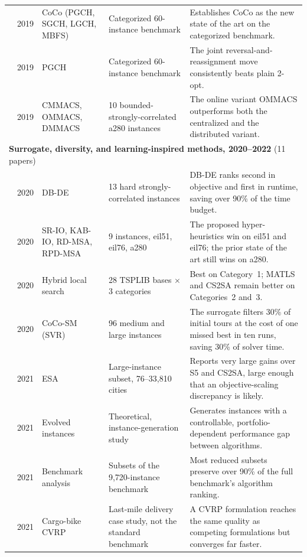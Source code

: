 {\begin{longtable}{@{}p{2.8cm}cp{3.0cm}p{4.9cm}p{7.9cm}@{}}
\citet{namazi2019cooperative} & 2019 & CoCo (PGCH, SGCH, LGCH, MBFS) & Categorized 60-instance benchmark & Establishes CoCo as the new state of the art on the categorized benchmark. \\
\citet{namazi2019profit} & 2019 & PGCH & Categorized 60-instance benchmark & The joint reversal-and-reassignment move consistently beats plain 2-opt. \\
\citet{zouari2019new} & 2019 & CMMACS, OMMACS, DMMACS & 10 bounded-strongly-correlated a280 instances & The online variant OMMACS outperforms both the centralized and the distributed variant. \\
\midrule \multicolumn{5}{l}{\textbf{Surrogate, diversity, and learning-inspired methods, 2020--2022} (11 papers)} \\ \midrule
\citet{ali2020differential} & 2020 & DB-DE & 13 hard strongly-correlated instances & DB-DE ranks second in objective and first in runtime, saving over 90\% of the time budget. \\
\citet{ali2020hyper} & 2020 & SR-IO, KAB-IO, RD-MSA, RPD-MSA & 9 instances, eil51, eil76, a280 & The proposed hyper-heuristics win on eil51 and eil76; the prior state of the art still wins on a280. \\
\citet{maity2020efficient} & 2020 & Hybrid local search & 28 TSPLIB bases $\times$ 3 categories & Best on Category~1; MATLS and CS2SA remain better on Categories~2 and~3. \\
\citet{namazi2020surrogate} & 2020 & CoCo-SM (SVR) & 96 medium and large instances & The surrogate filters 30\% of initial tours at the cost of one missed best in ten runs, saving 30\% of solver time. \\
\citet{ali2021novel} & 2021 & ESA & Large-instance subset, 76--33{,}810 cities & Reports very large gains over S5 and CS2SA, large enough that an objective-scaling discrepancy is likely. \\
\citet{bossek2021generating} & 2021 & Evolved instances & Theoretical, instance-generation study & Generates instances with a controllable, portfolio-dependent performance gap between algorithms. \\
\citet{misir2021benchmark} & 2021 & Benchmark analysis & Subsets of the 9{,}720-instance benchmark & Most reduced subsets preserve over 90\% of the full benchmark's algorithm ranking. \\
\citet{naumov2021identifying} & 2021 & Cargo-bike CVRP & Last-mile delivery case study, not the standard benchmark & A CVRP formulation reaches the same quality as competing formulations but converges far faster. \\

\end{longtable}}
